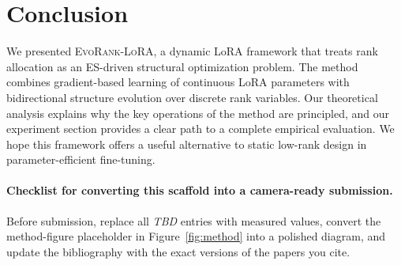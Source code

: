 \documentclass{article}
\newcommand{\method}{\textsc{EvoRank-LoRA}}
\newcommand{\TODO}{\textit{TBD}}
\begin{document}
\section{Conclusion}
We presented \method, a dynamic LoRA framework that treats rank allocation as an ES-driven structural optimization problem. The method combines gradient-based learning of continuous LoRA parameters with bidirectional structure evolution over discrete rank variables. Our theoretical analysis explains why the key operations of the method are principled, and our experiment section provides a clear path to a complete empirical evaluation. We hope this framework offers a useful alternative to static low-rank design in parameter-efficient fine-tuning.

\paragraph{Checklist for converting this scaffold into a camera-ready submission.}
Before submission, replace all \TODO{} entries with measured values, convert the method-figure placeholder in Figure~\ref{fig:method} into a polished diagram, and update the bibliography with the exact versions of the papers you cite.



\end{document}
